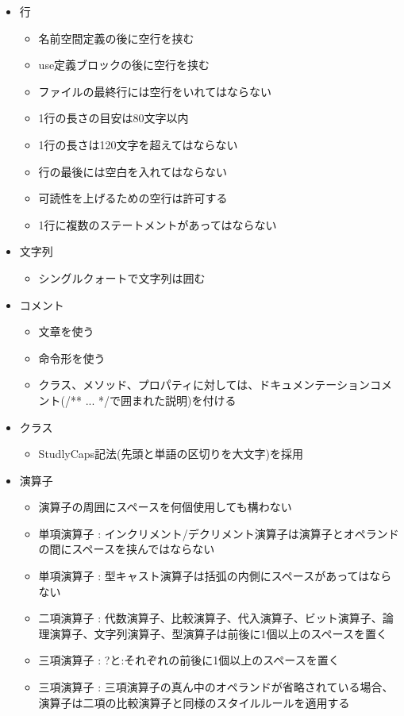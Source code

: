 \documentclass[a4paper, titlepage]{jsarticle}
\begin{document}
\begin{itemize}
\begin{itemize}
\begin{itemize}
    \end{itemize}
    \item 行
    \begin{itemize}
      \item 名前空間定義の後に空行を挟む
      \item use定義ブロックの後に空行を挟む
      \item ファイルの最終行には空行をいれてはならない
      \item 1行の長さの目安は80文字以内
      \item 1行の長さは120文字を超えてはならない
      \item 行の最後には空白を入れてはならない
      \item 可読性を上げるための空行は許可する
      \item 1行に複数のステートメントがあってはならない
    \end{itemize}
    \item 文字列
    \begin{itemize}
      \item シングルクォートで文字列は囲む
    \end{itemize}
    \item コメント
    \begin{itemize}
      \item 文章を使う
      \item 命令形を使う
      \item クラス、メソッド、プロパティに対しては、ドキュメンテーションコメント(/** ... */で囲まれた説明)を付ける
    \end{itemize}
    \item クラス
    \begin{itemize}
      \item StudlyCaps記法(先頭と単語の区切りを大文字)を採用
    \end{itemize}
    \item 演算子
    \begin{itemize}
      \item 演算子の周囲にスペースを何個使用しても構わない
      \item 単項演算子 : インクリメント/デクリメント演算子は演算子とオペランドの間にスペースを挟んではならない
      \item 単項演算子 : 型キャスト演算子は括弧の内側にスペースがあってはならない
      \item 二項演算子 : 代数演算子、比較演算子、代入演算子、ビット演算子、論理演算子、文字列演算子、型演算子は前後に1個以上のスペースを置く
      \item 三項演算子 : ?と:それぞれの前後に1個以上のスペースを置く
      \item 三項演算子 : 三項演算子の真ん中のオペランドが省略されている場合、演算子は二項の比較演算子と同様のスタイルルールを適用する
    \end{itemize}
  \end{itemize}
\end{itemize}
\end{document}
